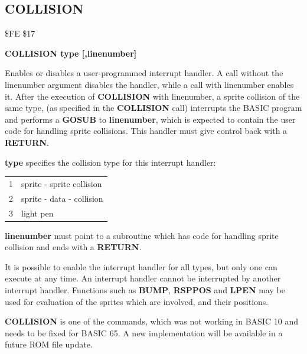 \subsection{COLLISION}
\begin{description}[leftmargin=2cm,style=nextline]
\item [Token:] \$FE \$17
\item [Format:] {\bf COLLISION type [,linenumber]}
\item [Usage:]  Enables or disables
                a user-programmed interrupt handler.
                A call without the linenumber argument disables the handler,
                while a call with linenumber enables it.
                After the execution of {\bf COLLISION} with
                linenumber, a sprite collision of the same type,
                (as specified in the {\bf COLLISION} call)
                interrupts the BASIC program and performs a {\bf GOSUB}
                to {\bf linenumber}, which is expected to contain
                the user code for handling sprite collisions.
                This handler must give control back with a {\bf RETURN}.

                {\bf type} specifies the collision type for
                this interrupt handler:
                    \begin{longtable}{ c | l}
                    1	& 	sprite - sprite collision \\
                    2	& 	sprite - data - collision \\
                    3	& 	light pen \\
                    \end{longtable}

                {\bf linenumber} must point to a subroutine
                which has code for handling sprite collision
                and ends with a {\bf RETURN}.

\item [Remarks:] It is possible to enable the interrupt handler for
               all types, but only one can execute at any time.
               An interrupt handler cannot be interrupted by another
               interrupt handler.
               Functions such as {\bf BUMP}, {\bf RSPPOS} and
               {\bf LPEN} may be used for evaluation of the sprites
               which are involved, and their positions.

\item [Info:] {\bf COLLISION} is one of the commands, which was not
              working in BASIC 10 and needs to be fixed for BASIC 65.
              A new implementation will be available in a future ROM file update.


\end{description}
